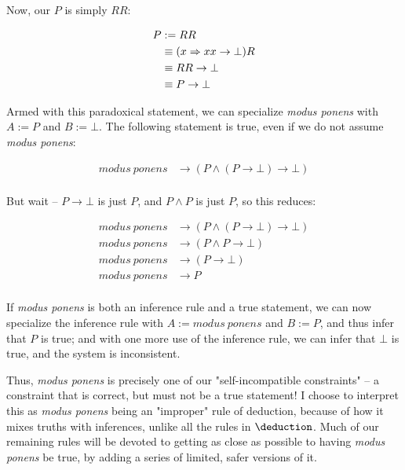 \documentclass{article}
\begin{document}
  Now, our $P$ is simply $RR$:
  
  \begin{align*}
    P &:= RR\\
      &\equiv (x \Rightarrow x x \to \bot)R\\
      &\equiv RR \to \bot\\
      &\equiv P \to \bot\\
  \end{align*}
  
  Armed with this paradoxical statement, we can specialize \emph{modus ponens} with $A := P$ and $B := \bot$. The following statement is true, even if we do not assume \emph{modus ponens}:
  
  \begin{align*}
    modus\ ponens &\to (P \wedge (P \to \bot) \to \bot)\\
  \end{align*}
  
  But wait – $P \to \bot$ is just $P$, and $P \wedge P$ is just $P$, so this reduces:
  
  \begin{align*}
    modus\ ponens &\to (P \wedge (P \to \bot) \to \bot)\\
    modus\ ponens &\to (P \wedge P \to \bot)\\
    modus\ ponens &\to (P \to \bot)\\
    modus\ ponens &\to P\\
  \end{align*}
  
  If \emph{modus ponens} is both an inference rule and a true statement, we can now specialize the inference rule with $A := modus\ ponens$ and $B := P$, and thus infer that $P$ is true; and with one more use of the inference rule, we can infer that $\bot$ is true, and the system is inconsistent.
  
  Thus, \emph{modus ponens} is precisely one of our "self-incompatible constraints" – a constraint that is correct, but must not be a true statement! I choose to interpret this as \emph{modus ponens} being an "improper" rule of deduction, because of how it mixes truths with inferences, unlike all the rules in $\deduction$. Much of our remaining rules will be devoted to getting as close as possible to having \emph{modus ponens} be true, by adding a series of limited, safer versions of it.
  
  
    
  
\end{document}
